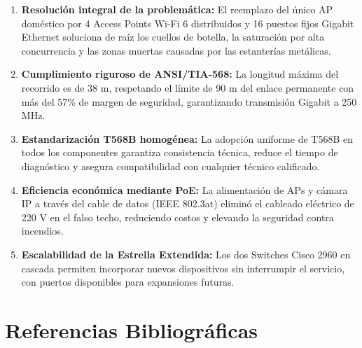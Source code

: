 \documentclass[12pt,a4paper]{article}
\begin{document}
\begin{enumerate}[leftmargin=1.8em,label=\textbf{\arabic*.},itemsep=5pt]
  \item \textbf{Resolución integral de la problemática:} El reemplazo del único AP doméstico por 4 Access Points Wi-Fi 6 distribuidos y 16 puestos fijos Gigabit Ethernet soluciona de raíz los cuellos de botella, la saturación por alta concurrencia y las zonas muertas causadas por las estanterías metálicas.

  \item \textbf{Cumplimiento riguroso de ANSI/TIA-568:} La longitud máxima del recorrido es de 38 m, respetando el límite de 90 m del enlace permanente con más del 57\% de margen de seguridad, garantizando transmisión Gigabit a 250 MHz.

  \item \textbf{Estandarización T568B homogénea:} La adopción uniforme de T568B en todos los componentes garantiza consistencia técnica, reduce el tiempo de diagnóstico y asegura compatibilidad con cualquier técnico calificado.

  \item \textbf{Eficiencia económica mediante PoE:} La alimentación de APs y cámara IP a través del cable de datos (IEEE 802.3at) eliminó el cableado eléctrico de 220 V en el falso techo, reduciendo costos y elevando la seguridad contra incendios.

  \item \textbf{Escalabilidad de la Estrella Extendida:} Los dos Switches Cisco 2960 en cascada permiten incorporar nuevos dispositivos sin interrumpir el servicio, con puertos disponibles para expansiones futuras.
\end{enumerate}

\section{Referencias Bibliográficas}
\end{document}
